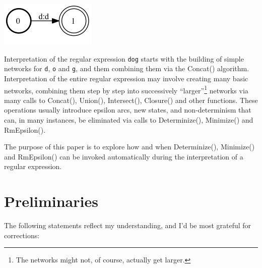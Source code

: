 \documentclass[letterpaper,12pt]{article}
\begin{document}
\begin{center}
\includegraphics[scale=0.5]{images/d.jpg}
\end{center}

\noindent
Interpretation of the regular expression \texttt{dog} starts
with the building of simple networks for \texttt{d}, \texttt{o} and \texttt{g}, and
them combining them via the Concat() algorithm.  Interpretation of the entire regular expression
may involve creating many basic networks, combining them step by step into
successively
``larger''\footnote{The networks might not, of course, actually get larger.} networks via many calls to Concat(), Union(), Intersect(), Closure() and other
functions.  These operations usually introduce epsilon arcs, new states, and
non-determinism that can, in many instances, be eliminated via calls to
Determinize(), Minimize() and RmEpsilon().

The purpose of this paper is to explore how and when Determinize(), Minimize() and
RmEpsilon() can be invoked automatically during the interpretation of a regular
expression.

\section{Preliminaries}

The following statements reflect my understanding, and I'd be most grateful for
corrections:
\end{document}
